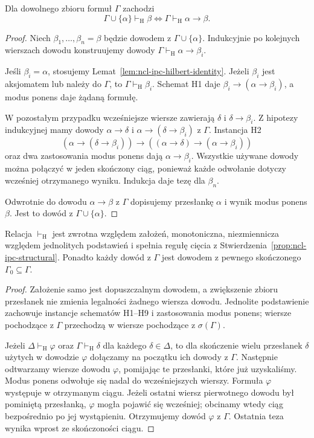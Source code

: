 \begin{twierdzenie}
\label{thm:ncl-ipc-hilbert-deduction}
Dla dowolnego zbioru formuł $\Gamma$ zachodzi
\[
 \Gamma\cup\{\alpha\}\vdash_{\mathrm H}\beta
 \iff \Gamma\vdash_{\mathrm H}\alpha\to\beta.
\]
\end{twierdzenie}
\begin{proof}
Niech $\beta_1,\ldots,\beta_n=\beta$ będzie dowodem
z $\Gamma\cup\{\alpha\}$. Indukcyjnie po kolejnych
wierszach dowodu konstruujemy dowody
$\Gamma\vdash_{\mathrm H}\alpha\to\beta_i$.

Jeśli $\beta_i=\alpha$, stosujemy
Lemat~\ref{lem:ncl-ipc-hilbert-identity}.
Jeżeli $\beta_i$ jest aksjomatem lub należy do
$\Gamma$, to $\Gamma\vdash_{\mathrm H}\beta_i$.
Schemat H1 daje $\beta_i\to(\alpha\to\beta_i)$,
a modus ponens daje żądaną formułę.

W pozostałym przypadku wcześniejsze wiersze
zawierają $\delta$ i $\delta\to\beta_i$.
Z hipotezy indukcyjnej mamy dowody
$\alpha\to\delta$ i $\alpha\to(\delta\to\beta_i)$
z $\Gamma$. Instancja H2
\[
 (\alpha\to(\delta\to\beta_i))\to
 ((\alpha\to\delta)\to(\alpha\to\beta_i))
\]
oraz dwa zastosowania modus ponens dają
$\alpha\to\beta_i$. Wszystkie używane dowody
można połączyć w jeden skończony ciąg, ponieważ
każde odwołanie dotyczy wcześniej otrzymanego
wyniku. Indukcja daje tezę dla $\beta_n$.

Odwrotnie do dowodu $\alpha\to\beta$ z $\Gamma$
dopisujemy przesłankę $\alpha$ i wynik modus ponens
$\beta$. Jest to dowód z $\Gamma\cup\{\alpha\}$.
\end{proof}

\begin{stwierdzenie}
\label{prop:ncl-ipc-hilbert-structural}
Relacja $\vdash_{\mathrm H}$ jest zwrotna względem
założeń, monotoniczna, niezmiennicza względem
jednolitych podstawień i spełnia regułę cięcia
z Stwierdzenia~\ref{prop:ncl-ipc-structural}.
Ponadto każdy dowód z $\Gamma$ jest dowodem
z pewnego skończonego $\Gamma_0\subseteq\Gamma$.
\end{stwierdzenie}
\begin{proof}
Założenie samo jest dopuszczalnym dowodem,
a zwiększenie zbioru przesłanek nie zmienia
legalności żadnego wiersza dowodu.
Jednolite podstawienie zachowuje instancje
schematów H1--H9 i zastosowania modus ponens;
wiersze pochodzące z $\Gamma$ przechodzą
w wiersze pochodzące z $\sigma(\Gamma)$.

Jeżeli $\Delta\vdash_{\mathrm H}\varphi$
oraz $\Gamma\vdash_{\mathrm H}\delta$ dla
każdego $\delta\in\Delta$, to dla skończenie wielu
przesłanek $\delta$ użytych w dowodzie $\varphi$
dołączamy na początku ich dowody z $\Gamma$.
Następnie odtwarzamy wiersze dowodu $\varphi$,
pomijając te przesłanki, które już uzyskaliśmy.
Modus ponens odwołuje się nadal do wcześniejszych
wierszy. Formuła $\varphi$ występuje w otrzymanym
ciągu. Jeżeli ostatni wiersz pierwotnego dowodu
był pominiętą przesłanką, $\varphi$ mogła pojawić
się wcześniej; obcinamy wtedy ciąg bezpośrednio
po jej wystąpieniu. Otrzymujemy dowód $\varphi$ z $\Gamma$.
Ostatnia teza wynika wprost ze skończoności ciągu.
\end{proof}

